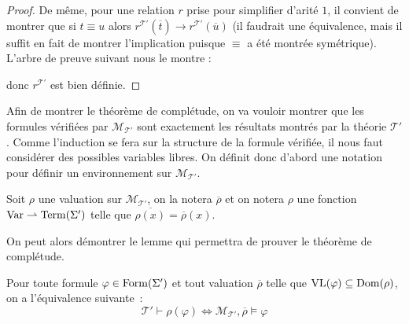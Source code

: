 \begin{proof}
  De même, pour une relation $r$ prise pour simplifier d'arité $1$, il convient
  de montrer que si $t\equiv u$ alors
  $r^{\mathcal T'}(\overline t)\to r^{\mathcal T'}(\overline u)$ (il faudrait une
  équivalence, mais il suffit en fait de montrer l'implication puisque $\equiv$
  a été montrée symétrique). L'arbre de preuve suivant nous le montre :
  \begin{prooftree}
  \end{prooftree}
  donc $r^{\mathcal T'}$ est bien définie.
\end{proof}

Afin de montrer le théorème de complétude, on va vouloir montrer que les
formules vérifiées par $\mathcal M_{\mathcal T'}$ sont exactement les résultats
montrés par la théorie $\mathcal T'$. Comme l'induction se fera sur la structure
de la formule vérifiée, il nous faut considérer des possibles variables libres.
On définit donc d'abord une notation pour définir un environnement sur
$\mathcal M_{\mathcal T'}$.

\begin{definition}
    Soit $\rho$ une valuation sur $\mathcal M_{\mathcal T'}$, on la notera
    $\overline \rho$ et on notera $\rho$ une fonction
    $\Var \partialto \Term(\Sigma')$ telle que
    $\overline{\rho(x)} = \overline\rho(x)$.
\end{definition}

On peut alors démontrer le lemme qui permettra de prouver le théorème de
complétude.

\begin{lemma}
  Pour toute formule $\varphi \in \Formula(\Sigma')$ et tout valuation
  $\overline\rho$ telle que $\VL(\varphi)\subseteq \dom(\rho)$, on a
  l'équivalence suivante~:
  \[\mathcal T' \vdash \rho(\varphi) \iff
  \mathcal M_{\mathcal T'},\overline \rho\models \varphi\]
\end{lemma}

